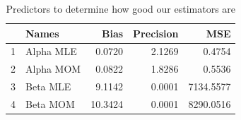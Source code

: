 \documentclass{article}\usepackage[]{graphicx}\usepackage[]{xcolor}
\begin{document}
\begin{table}[ht]
\centering
\begin{tabular}{rlrrr}
  \hline
 & Names & Bias & Precision & MSE \\ 
  \hline
1 & Alpha MLE & 0.0720 & 2.1269 & 0.4754 \\ 
  2 & Alpha MOM & 0.0822 & 1.8286 & 0.5536 \\ 
  3 & Beta MLE & 9.1142 & 0.0001 & 7134.5577 \\ 
  4 & Beta MOM & 10.3424 & 0.0001 & 8290.0516 \\ 
   \hline
\end{tabular}
\caption{Predictors to determine how good our estimators are}
\label{Table 2}
\end{table}
\end{document}
